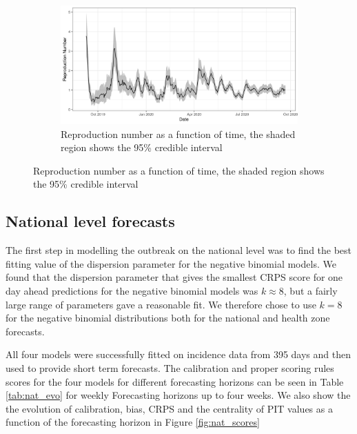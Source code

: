 \documentclass[12pt]{article}
\begin{document}
\begin{figure}[h!]
\bigskip

\begin{subfigure}{\textwidth}
  \centering
  \includegraphics[width=\textwidth]{../output/nat_Rs.png}
  \caption{Reproduction number as a function of time, the shaded region shows the 95\% credible interval}
  \label{fig:rep_num}
\end{subfigure}
\end{figure}

\subsection{National level forecasts}
The first step in modelling the outbreak on the national level was to find the best fitting value of the dispersion parameter for the negative binomial models. We found that the dispersion parameter that gives the smallest CRPS score for one day ahead predictions for the negative binomial models was $k\approx8$, but a fairly large range of parameters gave a reasonable fit. We therefore chose to use $k=8$ for the negative binomial distributions both for the national and health zone forecasts.

All four models were successfully fitted on incidence data from 395 days and then used to provide short term forecasts. The calibration and proper scoring rules scores for the four models for different forecasting horizons can be seen in Table \ref{tab:nat_evo} for weekly Forecasting horizons up to four weeks. We also show the the evolution of calibration, bias, CRPS and the centrality of PIT values as a function of the forecasting horizon in Figure \ref{fig:nat_scores}

\end{document}
